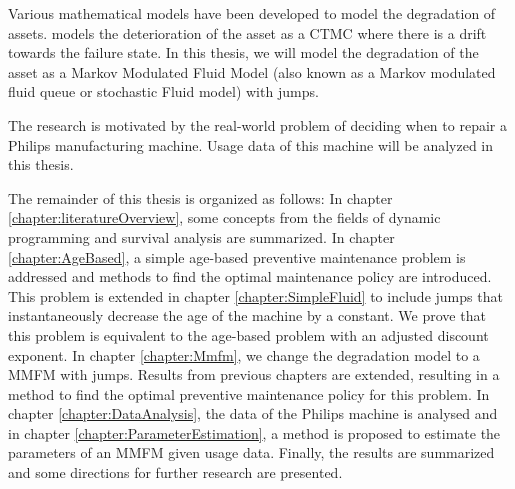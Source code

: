 Various mathematical models have been developed to model the degradation of assets.
\cite{Derman1963} models the deterioration of the asset as a CTMC where there is a drift towards the failure state.
In this thesis, we will model the degradation of the asset as a Markov Modulated Fluid Model (also known as a Markov modulated fluid queue or stochastic Fluid model) with jumps.

The research is motivated by the real-world problem of deciding when to repair a Philips manufacturing machine.
Usage data of this machine will be analyzed in this thesis.

The remainder of this thesis is organized as follows:
In chapter \ref{chapter:literatureOverview}, some concepts from the fields of dynamic programming and survival analysis are summarized.  
In chapter \ref{chapter:AgeBased}, a simple age-based preventive maintenance problem is addressed and methods to find the optimal maintenance policy are introduced.
This problem is extended in chapter \ref{chapter:SimpleFluid} to include jumps that instantaneously decrease the age of the machine by a constant.
We prove that this problem is equivalent to the age-based problem with an adjusted discount exponent.
In chapter \ref{chapter:Mmfm}, we change the degradation model to a MMFM with jumps.
Results from previous chapters are extended, resulting in a method to find the optimal preventive maintenance policy for this problem.
In chapter \ref{chapter:DataAnalysis}, the data of the Philips machine is analysed and in chapter \ref{chapter:ParameterEstimation}, a method is proposed to estimate the parameters of an MMFM given usage data.
Finally, the results are summarized and some directions for further research are presented.

